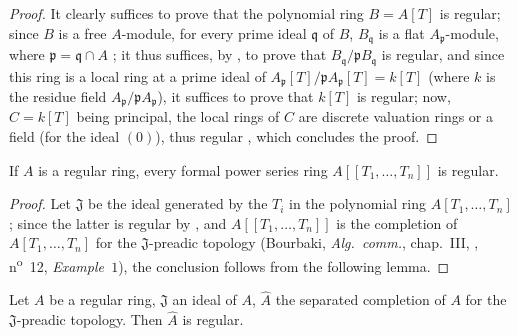 \begin{proof}
It clearly suffices to prove that the polynomial ring $B=A[T]$ is regular;
since $B$ is a free $A$-module, for every prime ideal $\mathfrak{q}$ of $B$, $B_\mathfrak{q}$ is a flat $A_\mathfrak{p}$-module, where $\mathfrak{p}=\mathfrak{q}\cap A$ ;
  it thus suffices, by , to prove that $B_\mathfrak{q}/\mathfrak{p}B_\mathfrak{q}$ is regular, and since this ring is a local ring at a prime ideal of $A_\mathfrak{p}[T]/\mathfrak{p}A_\mathfrak{p}[T]=k[T]$ (where $k$ is the residue field $A_\mathfrak{p}/\mathfrak{p}A_\mathfrak{p}$), it suffices to prove that $k[T]$ is regular;
now, $C=k[T]$ being principal, the local rings of $C$ are discrete valuation rings or a field (for the ideal $(0)$), thus regular , which concludes the proof.
\end{proof}

\begin{corollary}[17.3.8]
\label{0.17.3.8}
If $A$ is a regular ring, every formal power series ring $A[[T_1,\ldots,T_n]]$ is regular.
\end{corollary}

\begin{proof}
Let $\mathfrak{J}$ be the ideal generated by the $T_i$ in the polynomial ring $A[T_1,\ldots,T_n]$;
since the latter is regular by , and $A[[T_1,\ldots,T_n]]$ is the completion of $A[T_1,\ldots,T_n]$ for the $\mathfrak{J}$-preadic topology (Bourbaki, \emph{Alg.~comm.}, chap.~III, , n\textsuperscript{o}~12, \emph{Example~$1$}), the conclusion follows from the following lemma.
\end{proof}

\begin{lemma}[17.3.8.1]
\label{0.17.3.8.1}
Let $A$ be a regular ring, $\mathfrak{J}$ an ideal of $A$, $\widehat{A}$ the separated completion of $A$ for the $\mathfrak{J}$-preadic topology.
Then $\widehat{A}$ is regular.
\end{lemma}

